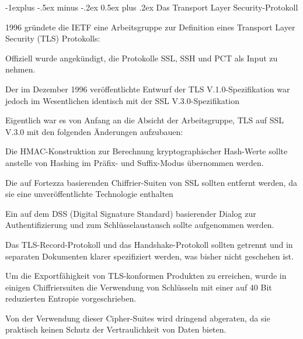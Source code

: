 \documentclass[a4paper]{article}
\makeatletter
\renewcommand{\subsection}{\@startsection{subsection}{2}{0mm}%
 {-1explus -.5ex minus -.2ex}%
 {0.5ex plus .2ex}%
 {\normalfont\normalsize\bfseries}}
\makeatother
\begin{document}
\begin{multicols}{3}
\begin{itemize*}
            \subsection{Das Transport Layer
                  Security-Protokoll}
            \begin{itemize*}
                  \item       1996 gründete die IETF eine Arbeitsgruppe zur Definition eines
                  Transport Layer Security (TLS) Protokolls:
                  \begin{itemize*}
                        \item Offiziell wurde angekündigt, die Protokolle SSL, SSH und PCT als Input zu nehmen.
                        \item Der im Dezember 1996 veröffentlichte Entwurf der TLS V.1.0-Spezifikation war jedoch im Wesentlichen identisch mit der SSL V.3.0-Spezifikation
                  \end{itemize*}
                  \item       Eigentlich war es von Anfang an die Absicht der Arbeitsgruppe, TLS auf
                  SSL V.3.0 mit den folgenden Änderungen aufzubauen:
                  \begin{itemize*}
                        \item Die HMAC-Konstruktion zur Berechnung kryptographischer Hash-Werte sollte anstelle von Hashing im Präfix- und Suffix-Modus übernommen werden.
                        \item Die auf Fortezza basierenden Chiffrier-Suiten von SSL sollten entfernt werden, da sie eine unveröffentlichte Technologie enthalten
                        \item Ein auf dem DSS (Digital Signature Standard) basierender Dialog zur Authentifizierung und zum Schlüsselaustausch sollte aufgenommen werden.
                        \item Das TLS-Record-Protokoll und das Handshake-Protokoll sollten getrennt und in separaten Dokumenten klarer spezifiziert werden, was bisher nicht geschehen ist.
                  \end{itemize*}
                  \item       Um die Exportfähigkeit von TLS-konformen Produkten zu erreichen, wurde
                  in einigen Chiffriersuiten die Verwendung von Schlüsseln mit einer auf
                  40 Bit reduzierten Entropie vorgeschrieben.
                  \begin{itemize*}
                        \item Von der Verwendung dieser Cipher-Suites wird dringend abgeraten, da sie praktisch keinen Schutz der Vertraulichkeit von Daten bieten.

\end{itemize*}
\end{itemize*}
\end{itemize*}
\end{multicols}
\end{document}
